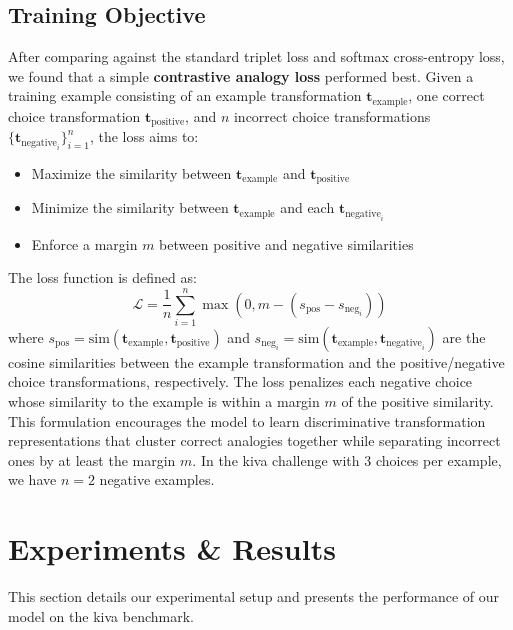 \documentclass[twocolumn]{article} %
\begin{document}
\subsection{Training Objective}

After comparing against the standard triplet loss and softmax cross-entropy loss, we found that a simple \textbf{contrastive analogy loss} performed best. Given a training example consisting of an example transformation $\mathbf{t}_{\text{example}}$, one correct choice transformation $\mathbf{t}_{\text{positive}}$, and $n$ incorrect choice transformations $\{\mathbf{t}_{\text{negative}_i}\}_{i=1}^{n}$, the loss aims to:
\begin{itemize}
\item Maximize the similarity between $\mathbf{t}_{\text{example}}$ and $\mathbf{t}_{\text{positive}}$
\item Minimize the similarity between $\mathbf{t}_{\text{example}}$ and each $\mathbf{t}_{\text{negative}_i}$
\item Enforce a margin $m$ between positive and negative similarities
\end{itemize}

The loss function is defined as:
\begin{equation}
\mathcal{L} = \frac{1}{n}\sum_{i=1}^{n} \max\left(0, m - \left(s_{\text{pos}} - s_{\text{neg}_i}\right)\right)
\end{equation}
where $s_{\text{pos}} = \text{sim}(\mathbf{t}_{\text{example}}, \mathbf{t}_{\text{positive}})$ and $s_{\text{neg}_i} = \text{sim}(\mathbf{t}_{\text{example}}, \mathbf{t}_{\text{negative}_i})$ are the cosine similarities between the example transformation and the positive/negative choice transformations, respectively. The loss penalizes each negative choice whose similarity to the example is within a margin $m$ of the positive similarity. This formulation encourages the model to learn discriminative transformation representations that cluster correct analogies together while separating incorrect ones by at least the margin $m$. In the \gls{kiva} challenge with 3 choices per example, we have $n=2$ negative examples.

\section{Experiments \& Results}

This section details our experimental setup and presents the performance of our model on the \gls{kiva} benchmark.
\end{document}
